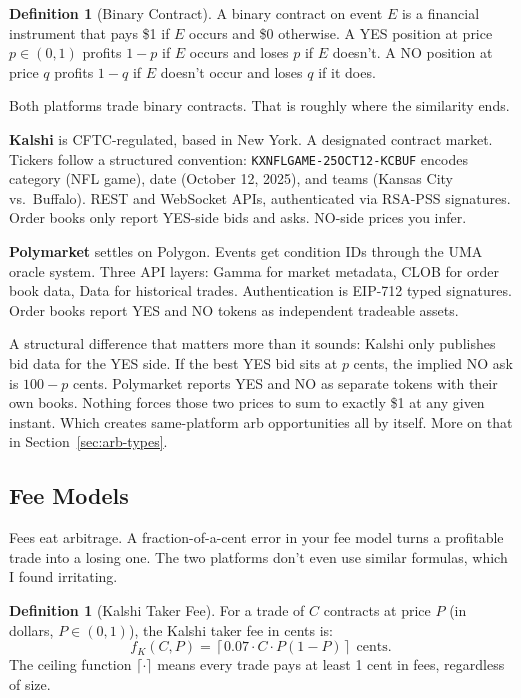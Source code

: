 \documentclass[11pt]{article}
\theoremstyle{definition}
\newtheorem{definition}[theorem]{Definition}
\theoremstyle{remark}
\begin{document}
\begin{definition}[Binary Contract]
\label{def:binary}
A binary contract on event $E$ is a financial instrument that pays \$1 if $E$ occurs and \$0 otherwise. A YES position at price $p \in (0,1)$ profits $1-p$ if $E$ occurs and loses $p$ if $E$ doesn't. A NO position at price $q$ profits $1-q$ if $E$ doesn't occur and loses $q$ if it does.
\end{definition}

Both platforms trade binary contracts. That is roughly where the similarity ends.

\textbf{Kalshi} is CFTC-regulated, based in New York. A designated contract market. Tickers follow a structured convention: \texttt{KXNFLGAME-25OCT12-KCBUF} encodes category (NFL game), date (October 12, 2025), and teams (Kansas City vs.\ Buffalo). REST and WebSocket APIs, authenticated via RSA-PSS signatures. Order books only report YES-side bids and asks. NO-side prices you infer.

\textbf{Polymarket} settles on Polygon. Events get condition IDs through the UMA oracle system. Three API layers: Gamma for market metadata, CLOB for order book data, Data for historical trades. Authentication is EIP-712 typed signatures. Order books report YES and NO tokens as independent tradeable assets.

A structural difference that matters more than it sounds: Kalshi only publishes bid data for the YES side. If the best YES bid sits at $p$ cents, the implied NO ask is $100 - p$ cents. Polymarket reports YES and NO as separate tokens with their own books. Nothing forces those two prices to sum to exactly \$1 at any given instant. Which creates same-platform arb opportunities all by itself. More on that in Section~\ref{sec:arb-types}.

\subsection{Fee Models}
\label{sec:fees}

Fees eat arbitrage. A fraction-of-a-cent error in your fee model turns a profitable trade into a losing one. The two platforms don't even use similar formulas, which I found irritating.

\begin{definition}[Kalshi Taker Fee]
\label{def:kalshi-fee}
For a trade of $C$ contracts at price $P$ (in dollars, $P \in (0,1)$), the Kalshi taker fee in cents is:
\begin{equation}
\label{eq:kalshi-fee}
f_K(C, P) = \left\lceil 0.07 \cdot C \cdot P(1-P) \right\rceil \text{ cents}.
\end{equation}
The ceiling function $\lceil \cdot \rceil$ means every trade pays at least 1 cent in fees, regardless of size.
\end{definition}
\end{document}
